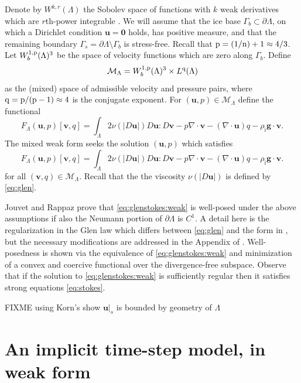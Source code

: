 \documentclass[hidelinks,onefignum,onetabnum,final]{siamart220329}  %
\newcommand{\Div}{\nabla\cdot}
\newcommand{\bg}{\mathbf{g}}
\newcommand{\bu}{\mathbf{u}}
\newcommand{\bv}{\mathbf{v}}
\newcommand{\bzero}{\bm{0}}
\newcommand{\nn}{{\text{\textnormal{n}}}}
\newcommand{\pp}{{\text{\textnormal{p}}}}
\newcommand{\qq}{{\text{\textnormal{q}}}}
\newcommand{\rhoi}{\rho_{\text{i}}}
\begin{document}
Denote by $W^{k,r}(\Lambda)$ the Sobolev space of functions with $k$ weak derivatives which are $r$th-power integrable \cite{Evans2010}.  We will assume that the ice base $\Gamma_b\subset\partial \Lambda$, on which a Dirichlet condition $\bu=\bzero$ holds, has positive measure, and that the remaining boundary $\Gamma_s = \partial \Lambda \setminus \Gamma_b$ is stress-free.  Recall that $\pp=(1/\nn)+1\approx 4/3$.  Let $W_b^{1,\pp}(\Lambda)^{3}$ be the space of velocity functions which are zero along $\Gamma_b$.  Define
\begin{equation}
\mathcal{M}_\Lambda = W_b^{1,\pp}(\Lambda)^3 \times L^\qq(\Lambda)  \label{eq:glenstokes:mixedspace}
\end{equation}
as the (mixed) space of admissible velocity and pressure pairs, where $\qq=\pp/(\pp-1)\approx 4$ is the conjugate exponent.  For $(\bu,p) \in \mathcal{M}_\Lambda$ define the functional
\begin{equation}
F_\Lambda(\bu,p)[\bv,q] = \int_\Lambda 2 \nu(|D\bu|) D\bu : D\bv - p \Div\bv - (\Div\bu) q - \rhoi \bg \cdot \bv. \label{eq:glenstokes:fcnl}
\end{equation}
The mixed weak form seeks the solution $(\bu,p)$ which satisfies
\begin{equation}
F_\Lambda(\bu,p)[\bv,q] = \int_\Lambda 2 \nu(|D\bu|) D\bu : D\bv - p \Div\bv - (\Div\bu) q - \rhoi \bg \cdot \bv. \label{eq:glenstokes:weak}
\end{equation}
for all $(\bv,q) \in \mathcal{M}_\Lambda$.  Recall that the the viscosity $\nu(|D\bu|)$ is defined by \eqref{eq:glen}.

Jouvet and Rappaz \cite{JouvetRappaz2011} prove that \eqref{eq:glenstokes:weak} is well-posed under the above assumptions if also the Neumann portion of $\partial\Lambda$ is $C^1$.  A detail here is the regularization in the Glen law which differs between \eqref{eq:glen} and the form in \cite{JouvetRappaz2011}, but the necessary modifications are addressed in the Appendix of \cite{IsaacStadlerGhattas2015}.  Well-posedness is shown via the equivalence of \eqref{eq:glenstokes:weak} and minimization of a convex and coercive functional over the divergence-free subspace.  Observe that if the solution to \eqref{eq:glenstokes:weak} is sufficiently regular then it satisfies strong equations \eqref{eq:stokes}.

FIXME using Korn's \cite{Pompe2003} show $\bu|_s$ is bounded by geometry of $\Lambda$


\section{An implicit time-step model, in weak form} \label{sec:model}
\end{document}
